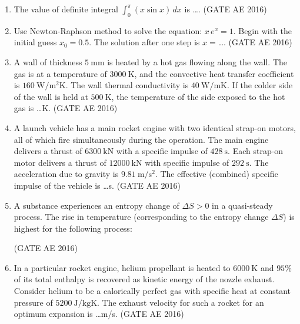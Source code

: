\documentclass[journal,12pt,onecolumn]{IEEEtran}
\theoremstyle{remark}
\begin{document}
\begin{enumerate}
\item The value of definite integral
$
\int_{0}^{\pi} (x \sin x)\, dx
$
is \dots.
\hfill(GATE AE 2016)



\item Use Newton-Raphson method to solve the equation: $x\,e^x = 1$. Begin with the initial guess $x_0 = 0.5$. The solution after one step is $x = $\dots.
\hfill(GATE AE 2016)



\item A wall of thickness $5~\mathrm{mm}$ is heated by a hot gas flowing along the wall. The gas is at a temperature of $3000~\mathrm{K}$, and the convective heat transfer coefficient is $160~\mathrm{W/m^2 K}$. The wall thermal conductivity is $40~\mathrm{W/mK}$. If the colder side of the wall is held at $500~\mathrm{K}$, the temperature of the side exposed to the hot gas is \dots K.
\hfill(GATE AE 2016)



\item A launch vehicle has a main rocket engine with two identical strap-on motors, all of which fire simultaneously during the operation. The main engine delivers a thrust of $6300~\mathrm{kN}$ with a specific impulse of $428~\mathrm{s}$. Each strap-on motor delivers a thrust of $12000~\mathrm{kN}$ with specific impulse of $292~\mathrm{s}$. The acceleration due to gravity is $9.81~\mathrm{m/s^2}$. The effective (combined) specific impulse of the vehicle is \dots s.
\hfill(GATE AE 2016)



\item A substance experiences an entropy change of $\Delta S > 0$ in a quasi-steady process. The rise in temperature (corresponding to the entropy change $\Delta S$) is highest for the following process:
\begin{enumerate}
\end{enumerate}
\hfill(GATE AE 2016)



\item In a particular rocket engine, helium propellant is heated to $6000~\mathrm{K}$ and $95\%$ of its total enthalpy is recovered as kinetic energy of the nozzle exhaust. Consider helium to be a calorically perfect gas with specific heat at constant pressure of $5200~\mathrm{J/kgK}$. The exhaust velocity for such a rocket for an optimum expansion is \dots m/s.
\hfill(GATE AE 2016)




\end{enumerate}
\end{document}
